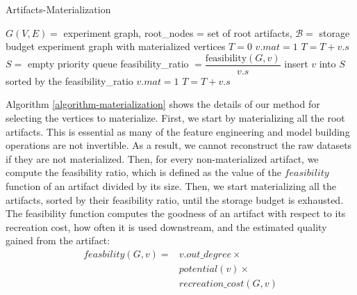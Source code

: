 \begin{algorithm}[h]
\caption{Artifacts-Materialization}\label{algorithm-materialization}
\begin{algorithmic}[1]
\Require  $G(V,E)=$ experiment graph, root\_nodes = set of root artifacts, $\mathcal{B}=$ storage budget
\Ensure experiment graph with materialized vertices
\State $T= 0$ 
 
		\State $v.mat = 1$
		\State $T = T + v.s$
	\EndIf
\EndFor
\State $S = $ empty priority queue
		\State feasibility\_ratio $= \dfrac{\text{feasibility}(G, v)}{v.s}$
		\State insert $v$ into $S$ sorted by the feasibility\_ratio
	\EndIf
\EndFor
{}
		\State $v.mat = 1$
		\State $T = T + v.s$		
	\EndIf
\EndFor
\end{algorithmic}
\end{algorithm}
Algorithm \ref{algorithm-materialization} shows the details of our method for selecting the vertices to materialize.
First, we start by materializing all the root artifacts.
This is essential as many of the feature engineering and model building operations are not invertible.
As a result, we cannot reconstruct the raw datasets if they are not materialized.
Then, for every non-materialized artifact, we compute the feasibility ratio, which is defined as the value of the $feasibility$ function of an artifact divided by its size.
Then, we start materializing all the artifacts, sorted by their feasibility ratio, until the storage budget is exhausted.
The feasibility function computes the goodness of an artifact with respect to its recreation cost, how often it is used downstream, and the estimated quality gained from the artifact:
\begin{equation}
\begin{split}
feasbility(G,v) = 	& v.out\_degree \times\\
								&	potential(v) \times \\
								& recreation\_cost(G,v)  
 \end{split}
\end{equation}

